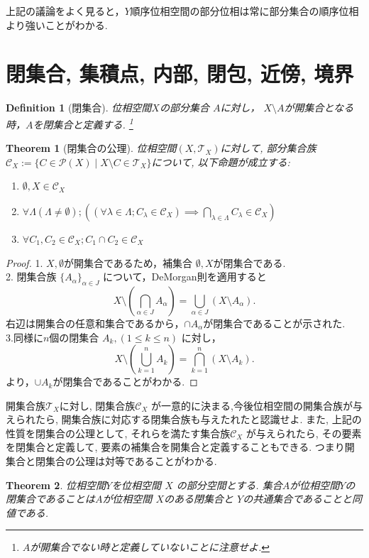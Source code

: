 \documentclass[dvipdfmx]{jbook}
\newtheorem{theorem}{Theorem}[section]
\newtheorem{definition}{Definition}[section]
\theoremstyle{remark}
\theoremstyle{plain}
\begin{document}
上記の議論をよく見ると，$Y$順序位相空間の部分位相は常に部分集合の順序位相より強いことがわかる.

\section{閉集合, 集積点, 内部, 閉包, 近傍, 境界}

\begin{definition}[閉集合]
	位相空間$X$の部分集合 $A$に対し， $X \setminus A$が開集合となる時，$A$を閉集合と定義する. \footnote{$A$が開集合でない時と定義していないことに注意せよ.}
\end{definition}

\begin{theorem}[閉集合の公理]
	位相空間$\left( X, \mathcal{T}_X \right) $に対して, 部分集合族$\mathcal{C}_X := \{C \in \mathcal{P}\left( X \right)  \mid X\setminus C \in \mathcal{T}_X \} $について, 以下命題が成立する:

	\begin{enumerate}
		\item $\emptyset , X  \in \mathcal{C}_X$ 
		\item $\forall \Lambda\left( \Lambda \neq \emptyset \right) ;\left( \left( \forall \lambda \in \Lambda; C_{\lambda} \in \mathcal{C}_X \right) \implies \bigcap_{\lambda \in \Lambda} C_{\lambda} \in \mathcal{C}_X \right)$
		\item $\forall C_1, C_2 \in \mathcal{C}_X; C_1 \cap C_2 \in \mathcal{C}_X$
	\end{enumerate}

\end{theorem}

\begin{proof}
	1. $X,\emptyset$が開集合であるため，補集合 $\emptyset ,X$が閉集合である.\\
	2. 閉集合族 $\{A_{\alpha}\}_{\alpha \in J} $ について，DeMorgan則を適用すると
	\[
	X\setminus \left( \bigcap_{\alpha \in J} A_{\alpha}\right) = \bigcup_{\alpha \in J} \left( X\setminus A_{\alpha} \right) 
	.\] 
	右辺は開集合の任意和集合であるから，$\cap A_{\alpha}$が閉集合であることが示された.\\
	3.同様に$n$個の閉集合 $A_k,\left( 1\le k \le n \right) $ に対し，
	\[
	X\setminus \left( \bigcup_{k=1}^n A_k \right) = \bigcap_{k=1}^n\left( X \setminus A_k \right) 
	.\] 
	より，$\cup A_k$が閉集合であることがわかる.

\end{proof}

	 開集合族$\mathcal{T}_X$に対し, 閉集合族$\mathcal{C}_X$ が一意的に決まる,今後位相空間の開集合族が与えられたら, 開集合族に対応する閉集合族も与えたれたと認識せよ. 
	 また, 上記の性質を閉集合の公理として, それらを満たす集合族$\mathcal{C}_X$ が与えられたら, その要素を閉集合と定義して, 要素の補集合を開集合と定義することもできる.
	 つまり開集合と閉集合の公理は対等であることがわかる.
\begin{theorem}
	位相空間$Y$を位相空間 $X$ の部分空間とする. 集合$A$が位相空間$Y$の閉集合であることは$A$が位相空間 $X$のある閉集合と $Y$の共通集合であることと同値である.	
\end{theorem}
\end{document}
